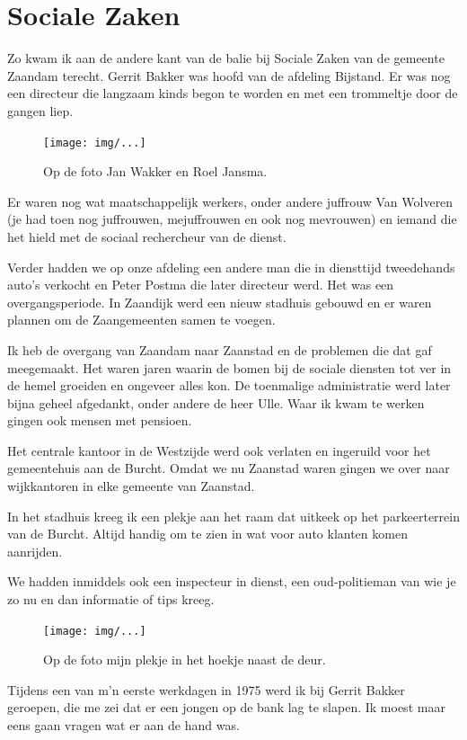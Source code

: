 \documentclass[12pt,twoside]{memoir}
\begin{document}
\chapter{Sociale Zaken} %
\label{cha:socialezaken}

Zo kwam ik aan de andere kant van de balie bij Sociale Zaken van de gemeente Zaandam terecht. Gerrit Bakker was hoofd van de afdeling Bijstand. Er was nog een directeur die langzaam kinds begon te worden en met een trommeltje door de gangen liep. 

\begin{figure}[t]
\texttt{[image: img/...]}
\caption{Op de foto Jan Wakker en Roel Jansma.}
\end{figure}

Er waren nog wat maatschappelijk werkers, onder andere juffrouw Van Wolveren (je had toen nog juffrouwen, mejuffrouwen en ook nog mevrouwen) en iemand die het hield met de sociaal rechercheur van de dienst. 

Verder hadden we op onze afdeling een andere man die in diensttijd tweedehands auto’s verkocht en Peter Postma die later directeur werd. Het was een overgangsperiode. In Zaandijk werd een nieuw stadhuis gebouwd en er waren plannen om de Zaangemeenten samen te voegen.

Ik heb de overgang van Zaandam naar Zaanstad en de problemen die dat gaf meegemaakt. Het waren jaren waarin de bomen bij de sociale diensten tot ver in de hemel groeiden en ongeveer alles kon. De toenmalige administratie werd later bijna geheel afgedankt, onder andere de heer Ulle. Waar ik kwam te werken gingen ook mensen met pensioen.

Het centrale kantoor in de Westzijde werd ook verlaten en ingeruild voor het gemeentehuis aan de Burcht. Omdat we nu Zaanstad waren gingen we over naar wijkkantoren in elke gemeente van Zaanstad. 

In het stadhuis kreeg ik een plekje aan het raam dat uitkeek op het parkeerterrein van de Burcht. Altijd handig om te zien in wat voor auto klanten komen aanrijden. 

We hadden inmiddels ook een inspecteur in dienst, een oud-politieman van wie je zo nu en dan informatie of tips kreeg. 

\begin{figure}[t]
\texttt{[image: img/...]}
\caption{Op de foto mijn plekje in het hoekje naast de deur.}
\end{figure}

Tijdens een van m’n eerste werkdagen in 1975 werd ik bij Gerrit Bakker geroepen, die me zei dat er een jongen op de bank lag te slapen. Ik moest maar eens gaan vragen wat er aan de hand was. 
\end{document}
